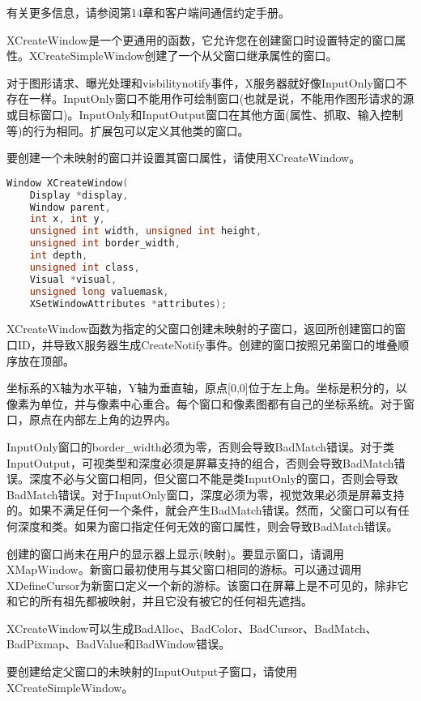 有关更多信息，请参阅第14章和客户端间通信约定手册。

XCreateWindow是一个更通用的函数，它允许您在创建窗口时设置特定的窗口属性。XCreateSimpleWindow创建了一个从父窗口继承属性的窗口。

对于图形请求、曝光处理和visbilitynotify事件，X服务器就好像InputOnly窗口不存在一样。InputOnly窗口不能用作可绘制窗口(也就是说，不能用作图形请求的源或目标窗口)。InputOnly和InputOutput窗口在其他方面(属性、抓取、输入控制等)的行为相同。扩展包可以定义其他类的窗口。

\noindent 要创建一个未映射的窗口并设置其窗口属性，请使用XCreateWindow。

\begin{lstlisting}[language=C]
Window XCreateWindow(
	Display *display,
	Window parent,
	int x, int y,
	unsigned int width, unsigned int height,
	unsigned int border_width,
	int depth,
	unsigned int class,
	Visual *visual,
	unsigned long valuemask,
	XSetWindowAttributes *attributes);
\end{lstlisting}

XCreateWindow函数为指定的父窗口创建未映射的子窗口，返回所创建窗口的窗口ID，并导致X服务器生成CreateNotify事件。创建的窗口按照兄弟窗口的堆叠顺序放在顶部。

坐标系的X轴为水平轴，Y轴为垂直轴，原点[0,0]位于左上角。坐标是积分的，以像素为单位，并与像素中心重合。每个窗口和像素图都有自己的坐标系统。对于窗口，原点在内部左上角的边界内。

InputOnly窗口的border\_width必须为零，否则会导致BadMatch错误。对于类InputOutput，可视类型和深度必须是屏幕支持的组合，否则会导致BadMatch错误。深度不必与父窗口相同，但父窗口不能是类InputOnly的窗口，否则会导致BadMatch错误。对于InputOnly窗口，深度必须为零，视觉效果必须是屏幕支持的。如果不满足任何一个条件，就会产生BadMatch错误。然而，父窗口可以有任何深度和类。如果为窗口指定任何无效的窗口属性，则会导致BadMatch错误。

创建的窗口尚未在用户的显示器上显示(映射)。要显示窗口，请调用XMapWindow。新窗口最初使用与其父窗口相同的游标。可以通过调用XDefineCursor为新窗口定义一个新的游标。该窗口在屏幕上是不可见的，除非它和它的所有祖先都被映射，并且它没有被它的任何祖先遮挡。

\begin{note}
XCreateWindow可以生成BadAlloc、BadColor、BadCursor、BadMatch、BadPixmap、BadValue和BadWindow错误。
\end{note}

要创建给定父窗口的未映射的InputOutput子窗口，请使用XCreateSimpleWindow。

